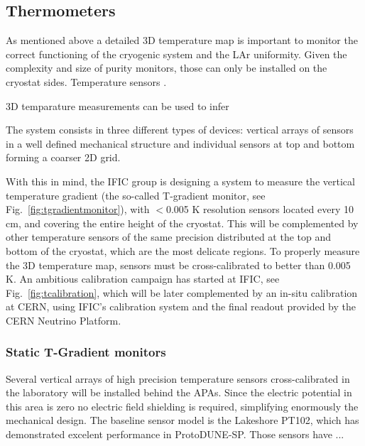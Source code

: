 \subsection{Thermometers}
\label{sec:fdsp-slow-cryo-therm}


As mentioned above a detailed 3D temperature map is important to monitor the correct functioning of the cryogenic system and the LAr uniformity.
Given the complexity and size of purity monitors, those can only be installed on the cryostat sides. Temperature sensors .

3D temparature measurements can be used to infer 

The system consists in three different types of devices: vertical arrays of sensors in a well defined mechanical structure and individual sensors at top and bottom forming a
coarser 2D grid.



With this in mind,
the IFIC group is designing a system to measure the vertical temperature gradient (the so-called T-gradient monitor, see Fig.~\ref{fig:tgradientmonitor}),
with $<$0.005 K resolution sensors located every 10 cm, and covering the entire height of the cryostat. This will be
complemented by other temperature sensors of the same precision distributed at the top and bottom of the cryostat,
which are the most delicate regions.
To properly measure the 3D temperature map, sensors must be cross-calibrated to better than 0.005 K. 
An ambitious calibration campaign has started at IFIC, see Fig.~\ref{fig:tcalibration}, which will be later complemented 
by an in-situ calibration at CERN, using IFIC’s calibration system and the final readout provided by the CERN Neutrino Platform. 



\subsubsection{Static T-Gradient monitors}

Several vertical arrays of high precision temperature sensors cross-calibrated in the laboratory will be installed behind the APAs.
Since the electric potential in this area is zero no electric field shielding is required, simplifying enormously the mechanical design.
The baseline sensor model is the Lakeshore PT102, which has demonstrated excelent performance in ProtoDUNE-SP. Those sensors have  ...

